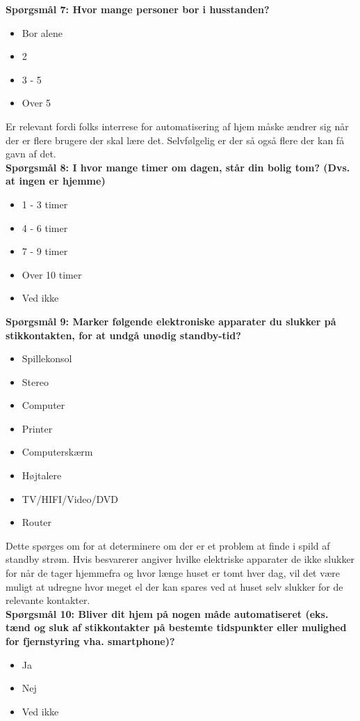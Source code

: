 {\bf{Spørgsmål 7: Hvor mange personer bor i husstanden?}}
\begin{itemize}
    \item Bor alene
    \item 2
    \item 3 - 5
    \item Over 5
\end{itemize}

Er relevant fordi folks interrese for automatisering af hjem måske ændrer sig når der er flere brugere der skal lære det. Selvfølgelig er der så også flere der kan få gavn af det.\\

{\bf{Spørgsmål 8: I hvor mange timer om dagen, står din bolig tom? (Dvs. at ingen er hjemme)}}
\begin{itemize}
    \item 1 - 3 timer\item 4 - 6 timer\item 7 - 9 timer\item Over 10 timer\item Ved ikke
\end{itemize}

{\bf{Spørgsmål 9: Marker følgende elektroniske apparater du slukker på stikkontakten, for at undgå unødig standby-tid?}}
\begin{itemize}
    \item Spillekonsol
    \item Stereo
    \item Computer
    \item Printer
    \item Computerskærm
    \item Højtalere
    \item TV/HIFI/Video/DVD
    \item Router
\end{itemize}

Dette spørges om for at determinere om der er et problem at finde i spild af standby strøm. Hvis besvarerer angiver hvilke elektriske apparater de ikke slukker for når de tager hjemmefra og hvor længe huset er tomt hver dag, vil det være muligt at udregne hvor meget el der kan spares ved at huset selv slukker for de relevante kontakter.\\

{\bf{Spørgsmål 10: Bliver dit hjem på nogen måde automatiseret (eks. tænd og sluk af stikkontakter på bestemte tidspunkter eller mulighed for fjernstyring vha. smartphone)?}}
\begin{itemize}
    \item Ja\item Nej\item Ved ikke
\end{itemize}

